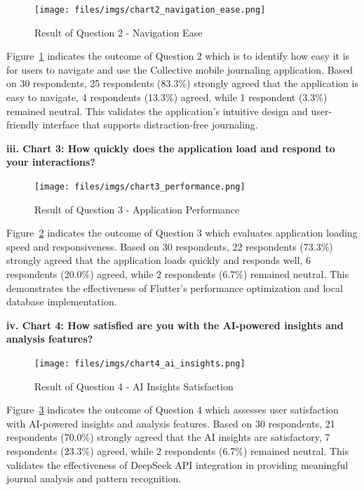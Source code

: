 \begin{figure}[H]
\centering
\texttt{[image: files/imgs/chart2\_navigation\_ease.png]}
\caption{Result of Question 2 - Navigation Ease}
\label{fig:chart2-navigation}
\end{figure}

Figure~\ref{fig:chart2-navigation} indicates the outcome of Question 2 which is to identify how easy it is for users to navigate and use the Collective mobile journaling application. Based on 30 respondents, 25 respondents (83.3\%) strongly agreed that the application is easy to navigate, 4 respondents (13.3\%) agreed, while 1 respondent (3.3\%) remained neutral. This validates the application's intuitive design and user-friendly interface that supports distraction-free journaling.

\textbf{iii. Chart 3: How quickly does the application load and respond to your interactions?}

\begin{figure}[H]
\centering
\texttt{[image: files/imgs/chart3\_performance.png]}
\caption{Result of Question 3 - Application Performance}
\label{fig:chart3-performance}
\end{figure}

Figure~\ref{fig:chart3-performance} indicates the outcome of Question 3 which evaluates application loading speed and responsiveness. Based on 30 respondents, 22 respondents (73.3\%) strongly agreed that the application loads quickly and responds well, 6 respondents (20.0\%) agreed, while 2 respondents (6.7\%) remained neutral. This demonstrates the effectiveness of Flutter's performance optimization and local database implementation.

\textbf{iv. Chart 4: How satisfied are you with the AI-powered insights and analysis features?}

\begin{figure}[H]
\centering
\texttt{[image: files/imgs/chart4\_ai\_insights.png]}
\caption{Result of Question 4 - AI Insights Satisfaction}
\label{fig:chart4-ai}
\end{figure}

Figure~\ref{fig:chart4-ai} indicates the outcome of Question 4 which assesses user satisfaction with AI-powered insights and analysis features. Based on 30 respondents, 21 respondents (70.0\%) strongly agreed that the AI insights are satisfactory, 7 respondents (23.3\%) agreed, while 2 respondents (6.7\%) remained neutral. This validates the effectiveness of DeepSeek API integration in providing meaningful journal analysis and pattern recognition.

